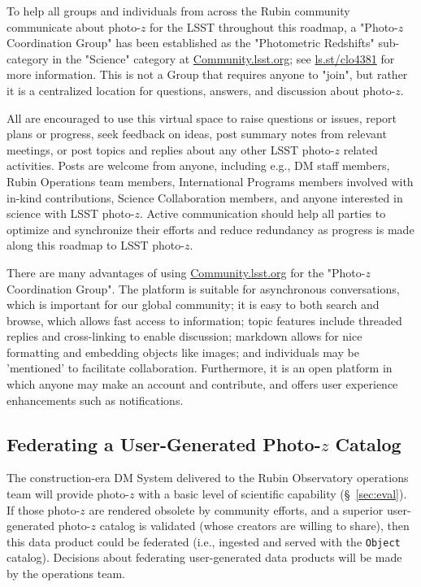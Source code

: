 \documentclass[DM,authoryear,toc]{lsstdoc}
\begin{document}
To help all groups and individuals from across the Rubin community communicate about photo-$z$ for the LSST throughout this roadmap, a "Photo-$z$ Coordination Group" has been established as the "Photometric Redshifts" sub-category in the "Science" category at \url{Community.lsst.org}; see \url{ls.st/clo4381} for more information.
This is not a Group that requires anyone to "join", but rather it is a centralized location for questions, answers, and discussion about photo-$z$.

All are encouraged to use this virtual space to raise questions or issues, report plans or progress, seek feedback on ideas, post summary notes from relevant meetings, or post topics and replies about any other LSST photo-$z$ related activities.
Posts are welcome from anyone, including e.g., DM staff members, Rubin Operations team members, International Programs members involved with in-kind contributions, Science Collaboration members, and anyone interested in science with LSST photo-$z$.
Active communication should help all parties to optimize and synchronize their efforts and reduce redundancy as progress is made along this roadmap to LSST photo-$z$.

There are many advantages of using \url{Community.lsst.org} for the "Photo-$z$ Coordination Group".
The platform is suitable for asynchronous conversations, which is important for our global community; it is easy to both search and browse, which allows fast access to information; topic features include threaded replies and cross-linking to enable discussion; markdown allows for nice formatting and embedding objects like images; and individuals may be 'mentioned' to facilitate collaboration.
Furthermore, it is an open platform in which anyone may make an account and contribute, and offers user experience enhancements such as notifications.

\subsection{Federating a User-Generated Photo-$z$ Catalog}\label{ssec:time_ops_ugfed}

The construction-era DM System delivered to the Rubin Observatory operations team will provide photo-$z$ with a basic level of scientific capability (\S~\ref{sec:eval}). 
If those photo-$z$ are rendered obsolete by community efforts, and a superior user-generated photo-$z$ catalog is validated (whose creators are willing to share), then this data product could be federated (i.e., ingested and served with the {\tt Object} catalog).
Decisions about federating user-generated data products will be made by the operations team.
\end{document}
